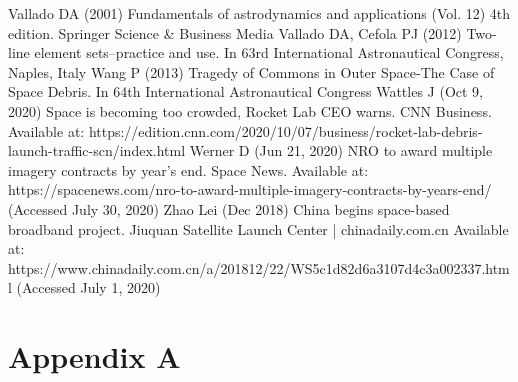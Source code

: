 \documentclass[12pt,a4paper,notitlepage,oneside,openright]{report}
\begin{document}
\begin{thebibliography}{100}
 Vallado DA (2001) Fundamentals of astrodynamics and applications (Vol. 12) 4th edition. Springer Science \& Business Media
 Vallado DA, Cefola PJ (2012) Two-line element sets–practice and use. In 63rd International Astronautical Congress, Naples, Italy
 Wang P (2013) Tragedy of Commons in Outer Space-The Case of Space Debris. In 64th International Astronautical Congress
 Wattles J (Oct 9, 2020) Space is becoming too crowded, Rocket Lab CEO warns. CNN Business. Available at: https://edition.cnn.com/2020/10/07/business/rocket-lab-debris-launch-traffic-scn/index.html
 Werner D (Jun 21, 2020) NRO to award multiple imagery contracts by year’s end. Space News. Available at: https://spacenews.com/nro-to-award-multiple-imagery-contracts-by-years-end/ (Accessed July 30, 2020)
 Zhao Lei (Dec 2018) China begins space-based broadband project. Jiuquan Satellite Launch Center | chinadaily.com.cn Available at: https://www.chinadaily.com.cn/a/201812/22/WS5c1d82d6a3107d4c3a002337.html (Accessed July 1, 2020)




\end{thebibliography}


\newpage
\chapter*{Appendix A}
\label{app}
\end{document}
